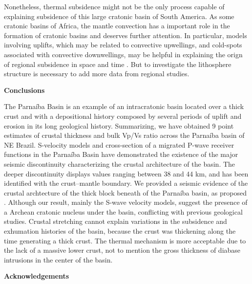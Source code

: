 \documentclass[paper,11pt]{geophysics}
\begin{document}
Nonetheless, thermal subsidence might not be the only process capable of explaining subsidence of this large cratonic basin of South America. As some cratonic basins of Africa, the mantle convection has a important role in the formation of cratonic basins and deserves further attention. In particular, models involving uplifts, which may be related to convective upwellings, and cold-spots associated with convective downwellings, may be helpful in explaining the orign of regional subsidence in space and time \citep{hartley_interior_1994}. But to investigate the lithosphere structure is necessary to add more data from regional studies. 
\linebreak
\linebreak

\begin{flushleft}
\textbf{\LARGE Conclusions}
\end{flushleft}

The Parnaíba Basin is an example of an intracratonic basin located over a thick crust and with a depositional history composed by several periods of uplift and erosion in its long geological history. Summarizing, we have obtained 9 point estimates of crustal thickness and bulk Vp/Vs ratio across the Parnaíba basin of NE Brazil. S-velocity models and cross-section of a migrated P-wave receiver functions in the Parnaíba Basin have demonstrated the existence of the major seismic discontinuity characterizing the crustal architecture of the basin. The deeper discontinuity displays values ranging between 38 and 44 km, and has been identified with the crust–mantle boundary. We provided a seismic evidence of the crustal archtecture of the thick block beneath of the Parnaíba basin, as proposed \cite{de_brito_neves_influence_1984,fuck_rodinia_2008,cordani_bacia_2009,daly_brasiliano_2014}. Although our result, mainly the S-wave velocity models, suggest the presence of a Archean cratonic nucleus under the basin, conflicting with previous geological studies. Crustal stretching cannot explain variations in the subsidence and exhumation histories of the basin, because the crust was thickening along the time generating a thick crust. The thermal mechanism is more acceptable due to the lack of a massive lower crust,  not to mention the gross thickness of diabase intrusions in the center of the basin.
\linebreak
\linebreak

\begin{flushleft}
\textbf{\LARGE Acknowledgements}
\end{flushleft}
\end{document}
